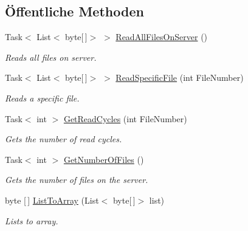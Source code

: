 \subsection*{Öffentliche Methoden}
\begin{DoxyCompactItemize}
\item 
Task$<$ List$<$ byte\mbox{[}$\,$\mbox{]}$>$ $>$ \mbox{\hyperlink{interfacemy_m_d_1_1_model_1_1_transmission_model_1_1_i_bluetooth_a1a929cee5eff377bd3a2c51fa802e597}{Read\+All\+Files\+On\+Server}} ()
\begin{DoxyCompactList}\small\item\em Reads all files on server. \end{DoxyCompactList}\item 
Task$<$ List$<$ byte\mbox{[}$\,$\mbox{]}$>$ $>$ \mbox{\hyperlink{interfacemy_m_d_1_1_model_1_1_transmission_model_1_1_i_bluetooth_ad1db5899a69c45439ad3aca8c7410c9e}{Read\+Specific\+File}} (int File\+Number)
\begin{DoxyCompactList}\small\item\em Reads a specific file. \end{DoxyCompactList}\item 
Task$<$ int $>$ \mbox{\hyperlink{interfacemy_m_d_1_1_model_1_1_transmission_model_1_1_i_bluetooth_a4101fa321005412173aa2676f29a4239}{Get\+Read\+Cycles}} (int File\+Number)
\begin{DoxyCompactList}\small\item\em Gets the number of read cycles. \end{DoxyCompactList}\item 
Task$<$ int $>$ \mbox{\hyperlink{interfacemy_m_d_1_1_model_1_1_transmission_model_1_1_i_bluetooth_a969f7d364636d505afc12ba4871c4b02}{Get\+Number\+Of\+Files}} ()
\begin{DoxyCompactList}\small\item\em Gets the number of files on the server. \end{DoxyCompactList}\item 
byte \mbox{[}$\,$\mbox{]} \mbox{\hyperlink{interfacemy_m_d_1_1_model_1_1_transmission_model_1_1_i_bluetooth_a6e595ebbbd481bd57f2af7d8efa8a77f}{List\+To\+Array}} (List$<$ byte\mbox{[}$\,$\mbox{]}$>$ list)
\begin{DoxyCompactList}\small\item\em Lists to array. \end{DoxyCompactList}\end{DoxyCompactItemize}
